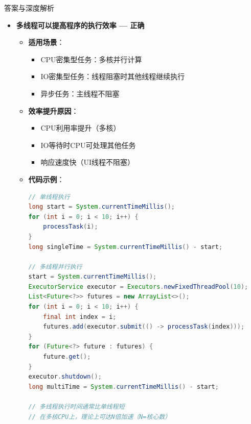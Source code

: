 \documentclass[12pt, a4paper]{ctexart}
\begin{document}
\begin{enumerate}[label=\textbf{\arabic*.}]
\begin{bluebox}{答案与深度解析}
		      \begin{itemize}[leftmargin=*, nosep, label={}]
			      \item[A] \textbf{多线程可以提高程序的执行效率 — 正确}
			            \begin{itemize}[label={}, leftmargin=*, nosep]
				            \item \textbf{适用场景}：
				                  \begin{itemize}[label={}, nosep]
					                  \item CPU密集型任务：多核并行计算
					                  \item IO密集型任务：线程阻塞时其他线程继续执行
					                  \item 异步任务：主线程不阻塞
				                  \end{itemize}
				            \item \textbf{效率提升原因}：
				                  \begin{itemize}[label={}, nosep]
					                  \item CPU利用率提升（多核）
					                  \item IO等待时CPU可处理其他任务
					                  \item 响应速度快（UI线程不阻塞）
				                  \end{itemize}
				            \item \textbf{代码示例}：
				                  \begin{lstlisting}[language=Java]
// 单线程执行
long start = System.currentTimeMillis();
for (int i = 0; i < 10; i++) {
    processTask(i);
}
long singleTime = System.currentTimeMillis() - start;

// 多线程并行执行
start = System.currentTimeMillis();
ExecutorService executor = Executors.newFixedThreadPool(10);
List<Future<?>> futures = new ArrayList<>();
for (int i = 0; i < 10; i++) {
    final int index = i;
    futures.add(executor.submit(() -> processTask(index)));
}
for (Future<?> future : futures) {
    future.get();
}
executor.shutdown();
long multiTime = System.currentTimeMillis() - start;

// 多线程执行时间通常比单线程短
// 在多核CPU上，理论上可达N倍加速（N=核心数）
				      \end{lstlisting}
			            \end{itemize}


\end{itemize}
\end{bluebox}
\end{enumerate}
\end{document}
